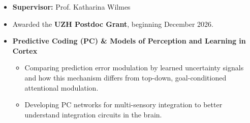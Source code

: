 \documentclass[11pt,a4paper,ragged2e,academicons]{altacv}
\begin{document}
\begin{fullwidth}
\makecvheader





\begin{itemize}
\item \textbf{Supervisor:} Prof. Katharina Wilmes
\item Awarded the \textbf{UZH Postdoc Grant}, beginning December 2026.
\item  \textbf{Predictive Coding (PC) \& Models of Perception and Learning in Cortex }
\begin{itemize}
    \item Comparing prediction error modulation by learned uncertainty signals and how this mechanism differs from top-down, goal-conditioned attentional modulation. 
    \item Developing PC networks for multi-sensory integration to better understand integration circuits in the brain. 
\end{itemize}
\end{itemize}



\end{fullwidth}
\end{document}
